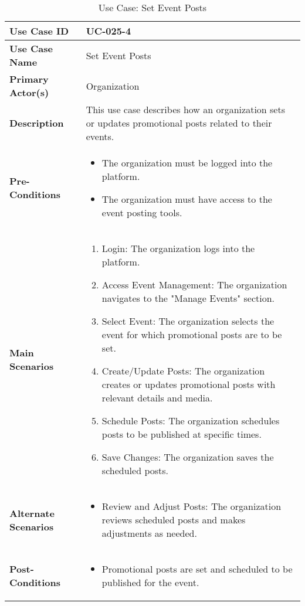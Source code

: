 \begin{table}[!ht]
    \centering
    \renewcommand{\arraystretch}{1.3} %
    \begin{tabularx}{\textwidth}{|l|X|}
        \hline
        \textbf{Use Case ID} & UC-025-4 \\
        \hline
        \textbf{Use Case Name} & Set Event Posts \\
        \hline
        \textbf{Primary Actor(s)} & Organization \\
        \hline
        \textbf{Description} & This use case describes how an organization sets or updates promotional posts related to their events. \\
        \hline
        \textbf{Pre-Conditions} & 
        \begin{itemize}[label=--,itemsep=0pt]
            \item The organization must be logged into the platform.
            \item The organization must have access to the event posting tools.
        \end{itemize} \\
        \hline
        \textbf{Main Scenarios} & 
        \begin{enumerate}[label=\arabic*.,itemsep=0pt]
            \item Login: The organization logs into the platform.
            \item Access Event Management: The organization navigates to the "Manage Events" section.
            \item Select Event: The organization selects the event for which promotional posts are to be set.
            \item Create/Update Posts: The organization creates or updates promotional posts with relevant details and media.
            \item Schedule Posts: The organization schedules posts to be published at specific times.
            \item Save Changes: The organization saves the scheduled posts.
        \end{enumerate} \\
        \hline
        \textbf{Alternate Scenarios} & 
        \begin{itemize}[label=--,itemsep=0pt]
            \item Review and Adjust Posts: The organization reviews scheduled posts and makes adjustments as needed.
        \end{itemize} \\
        \hline
        \textbf{Post-Conditions} & 
        \begin{itemize}[label=--,itemsep=0pt]
            \item Promotional posts are set and scheduled to be published for the event.
        \end{itemize} \\
        \hline
    \end{tabularx}
    \caption{Use Case: Set Event Posts}
    \label{tab:use-case-set-event-posts}
\end{table}





